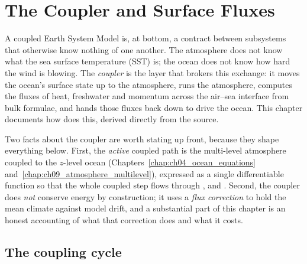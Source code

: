 \chapter{The Coupler and Surface Fluxes}\label{chap:ch13_coupler_fluxes}

\providecommand{\Cd}{C_{\!D}}        %
\providecommand{\Ch}{C_{\!H}}        %
\providecommand{\Ce}{C_{\!E}}        %
\providecommand{\Lvap}{L_v}          %
\providecommand{\qsat}{q_{\mathrm{sat}}}
\providecommand{\Qnet}{Q_{\mathrm{net}}}
\providecommand{\tausfc}{\boldsymbol{\tau}}

A coupled Earth System Model is, at bottom, a contract between subsystems that
otherwise know nothing of one another. The atmosphere does not know what the sea
surface temperature (SST) is; the ocean does not know how hard the wind is
blowing. The \emph{coupler} is the layer that brokers this exchange: it moves the
ocean's surface state up to the atmosphere, runs the atmosphere, computes the
fluxes of heat, freshwater and momentum across the air--sea interface from bulk
formulae, and hands those fluxes back down to drive the ocean. This chapter
documents how \model{} does this, derived directly from the source.

Two facts about the \model{} coupler are worth stating up front, because they
shape everything below. First, the \emph{active} coupled path is the multi-level
\dino{} atmosphere coupled to the $z$-level ocean
(Chapters~\ref{chap:ch04_ocean_equations} and~\ref{chap:ch09_atmosphere_multilevel}),
expressed as a single differentiable \jax{} function so that the whole coupled
step flows through ,  and 
\citep{jax2018}. Second, the coupler does \emph{not} conserve energy by
construction; it uses a \emph{flux correction} to hold the mean climate against
model drift, and a substantial part of this chapter is an honest accounting of
what that correction does and what it costs.

\section{The coupling cycle}

